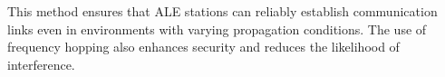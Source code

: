 This method ensures that ALE stations can reliably establish communication links even in environments with varying propagation conditions. The use of frequency hopping also enhances security and reduces the likelihood of interference.

